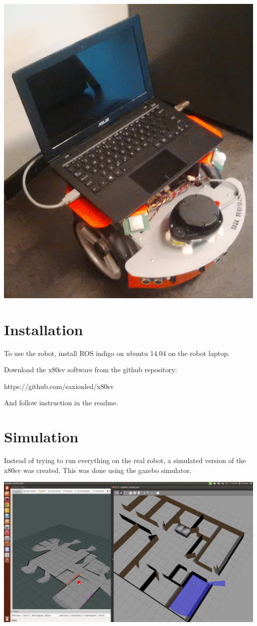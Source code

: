\documentclass[a4paper]{article}
\begin{document}
\includegraphics[width=\textwidth,height=\textheight,keepaspectratio]{img/fotorobot.png}

\section{Installation}
To use the robot, install ROS indigo on ubuntu 14.04 on the robot laptop.

Download the x80sv software from the github repository:

https://github.com/saxionled/x80sv

And follow instruction in the readme.

\section{Simulation}
Instead of trying to run everything on the real robot, a simulated version of the x80sv
was created. This was done using the gazebo simulator.

\includegraphics[width=\textwidth,height=\textheight,keepaspectratio]{img/office_sim_testgmapping.png}
\end{document}
